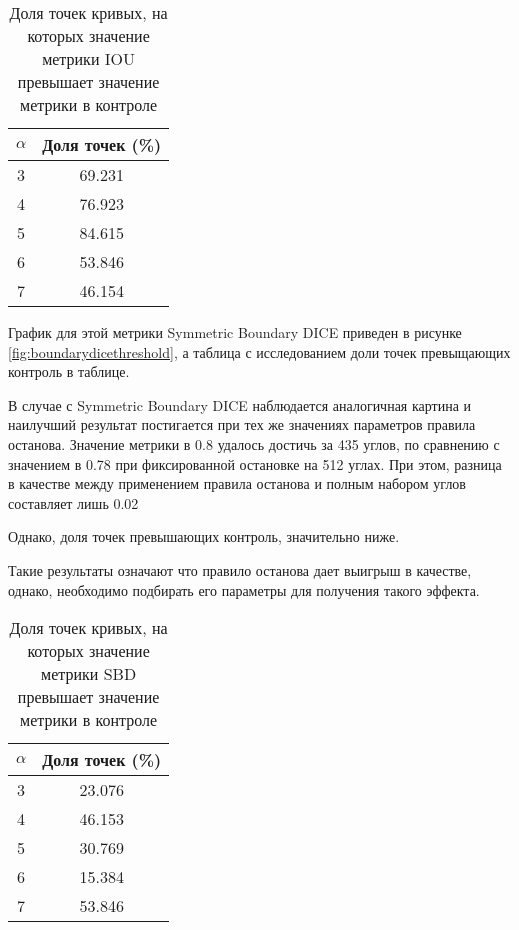 \begin{table}[H]
\centering
\caption{Доля точек кривых, на которых значение метрики IOU превышает значение метрики в  контроле}
\label{tab:thresholdingiou}
\begin{tabular}{|c|c|}
\hline
\(\alpha\) & Доля точек (\%) \\
\hline
3 & 69.231 \\
4 & 76.923 \\
5 & 84.615 \\
6 & 53.846 \\
7 & 46.154 \\
\hline
\end{tabular}
\end{table}

График для этой метрики Symmetric Boundary DICE приведен в рисунке \ref*{fig:boundarydicethreshold}, а таблица с исследованием доли точек превыщающих контроль в таблице.


В случае с Symmetric Boundary DICE наблюдается аналогичная картина и наилучший результат постигается при тех же значениях параметров правила останова. Значение метрики в 0.8 удалось достичь за 435 углов, по сравнению с значением в 0.78 при фиксированной остановке на 512 углах. При этом, разница в качестве между применением правила останова и полным набором углов составляет лишь 0.02

Однако, доля точек превышающих контроль, значительно ниже.

Такие результаты означают что правило останова дает выигрыш в качестве, однако, необходимо подбирать его параметры для получения такого эффекта.

\begin{table}[H]
\centering
\caption{Доля точек кривых, на которых значение метрики SBD превышает значение метрики в  контроле}
\label{tab:thresholdingsbd}
\begin{tabular}{|c|c|}
\hline
\(\alpha\) & Доля точек (\%) \\
\hline
3 & 23.076 \\
4 & 46.153 \\
5 & 30.769 \\
6 & 15.384 \\
7 & 53.846 \\
\hline
\end{tabular}
\end{table}

